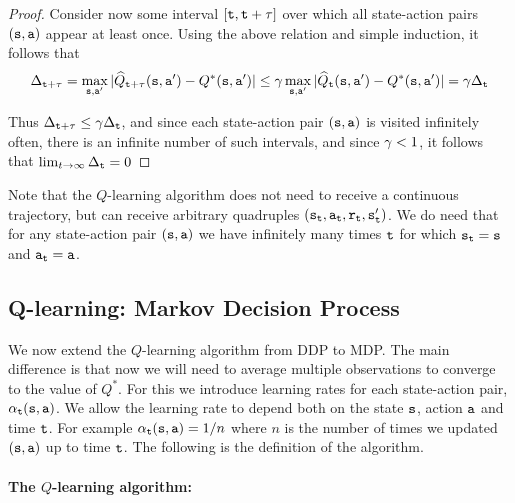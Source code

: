 \begin{proof}
Consider now some interval $[{\tt t},{\tt t}+\tau]$ over which all
state-action pairs $({\tt s},{\tt a})$ appear at least once. Using
the above relation and simple induction, it follows that 
\[
\Delta_{{\tt t}+\tau}=\max_{{\tt s},{\tt a}'}|\widehat{Q}_{{\tt t}+\tau}({\tt s},{\tt a}')-Q^{*}({\tt s},{\tt a}')|\leq\gamma\max_{{\tt s},{\tt a}'}|\widehat{Q}_{{\tt t}}({\tt s},{\tt a}')-Q^{*}({\tt s},{\tt a}')|=\gamma\Delta_{{\tt t}}
\]

Thus $\Delta_{{\tt t}+\tau}\le\gamma\Delta_{{\tt t}}$, and since each state-action pair $\left({\tt s},{\tt a}\right)$ is visited
infinitely often, there is an infinite number of such intervals, and
since $\gamma<1$, it follows that $\lim_{t\to\infty}\Delta_{{\tt t}}=0$

\end{proof}

 Note that the $Q$-learning algorithm does not need to receive a continuous trajectory, but can receive arbitrary quadruples
$({\tt s}_{\tt t},{\tt a}_{\tt t},{\tt r}_{\tt t},{\tt s}_{{\tt t}}')$. We do need that for any state-action pair $({\tt s},{\tt a})$ we have infinitely many times ${\tt t}$ for which ${\tt s}_{\tt t}={\tt s}$ and ${\tt a}_{\tt t}={\tt a}$.

\subsection{Q-learning: Markov Decision Process}


We now extend the $Q$-learning algorithm from DDP to MDP. The main
difference is that now we will need to average multiple observations
to converge to the value of $Q^*$. For this we introduce
learning rates for each state-action pair, $\alpha_{\tt t}({\tt s},{\tt a})$. We allow the
learning rate to depend both on the state ${\tt s}$, action ${\tt a}$
and time ${\tt t}$. For example $\alpha_{\tt t}({\tt s},{\tt a})=1/n$
where $n$ is the number of times we updated $({\tt s},{\tt a})$ up to
time ${\tt t}$. The following is the definition of the algorithm.

\paragraph{The $Q$-learning algorithm:}

